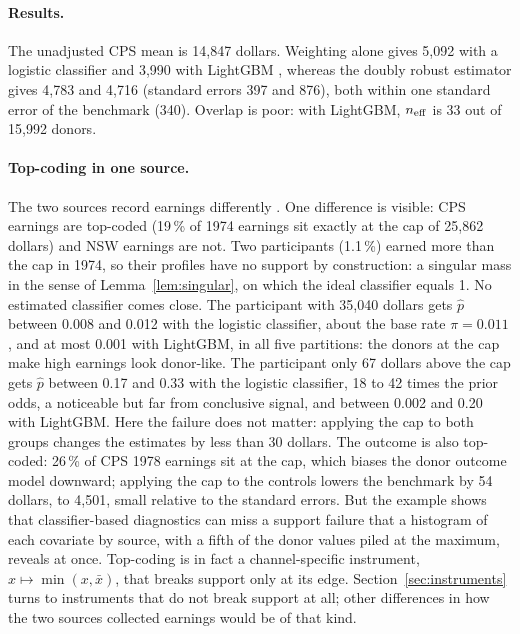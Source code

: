 \paragraph{Results.} The unadjusted CPS mean is 14{,}847 dollars. Weighting alone gives 5{,}092 with a logistic classifier and 3{,}990 with LightGBM \citep{ke2017}, whereas the doubly robust estimator gives 4{,}783 and 4{,}716 (standard errors 397 and 876), both within one standard error of the benchmark (340). Overlap is poor: with LightGBM, $n_{\mathrm{eff}}$ is 33 out of 15{,}992 donors.

\paragraph{Top-coding in one source.} The two sources record earnings differently \citep{smith2005}. One difference is visible: CPS earnings are top-coded (19\,\% of 1974 earnings sit exactly at the cap of 25{,}862 dollars) and NSW earnings are not. Two participants (1.1\,\%) earned more than the cap in 1974, so their profiles have no support by construction: a singular mass in the sense of Lemma~\ref{lem:singular}, on which the ideal classifier equals 1. No estimated classifier comes close. The participant with 35{,}040 dollars gets $\hat p$ between 0.008 and 0.012 with the logistic classifier, about the base rate $\pi=0.011$, and at most 0.001 with LightGBM, in all five partitions: the donors at the cap make high earnings look donor-like. The participant only 67 dollars above the cap gets $\hat p$ between 0.17 and 0.33 with the logistic classifier, 18 to 42 times the prior odds, a noticeable but far from conclusive signal, and between 0.002 and 0.20 with LightGBM. Here the failure does not matter: applying the cap to both groups changes the estimates by less than 30 dollars. The outcome is also top-coded: 26\,\% of CPS 1978 earnings sit at the cap, which biases the donor outcome model downward; applying the cap to the controls lowers the benchmark by 54 dollars, to 4{,}501, small relative to the standard errors. But the example shows that classifier-based diagnostics can miss a support failure that a histogram of each covariate by source, with a fifth of the donor values piled at the maximum, reveals at once. Top-coding is in fact a channel-specific instrument, $x\mapsto\min(x,\bar x)$, that breaks support only at its edge. Section~\ref{sec:instruments} turns to instruments that do not break support at all; other differences in how the two sources collected earnings would be of that kind.
